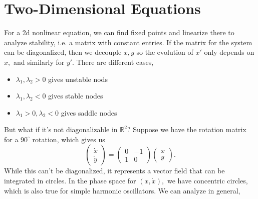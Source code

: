 \documentclass{article}
\numberwithin{equation}{section}
\begin{document}
\section{Two-Dimensional Equations}
For a 2d nonlinear equation, we can find fixed points and linearize there to analyze stability, i.e. a matrix with constant entries. If the matrix for the system can be diagonalized, then we decouple $x,y$ so the evolution of $x'$ only depends on $x,$ and similarly for $y'.$ There are different cases,
\begin{itemize}
    \item $\lambda_1,\lambda_2>0$ gives unstable nods
    \item $\lambda_1,\lambda_2<0$ gives stable nodes
    \item $\lambda_1>0,\lambda_2<0$ gives saddle nodes
\end{itemize}
But what if it's not diagonalizable in $\mathbb{R}^2?$ Suppose we have the rotation matrix for a $90^\circ$ rotation, which gives us 
\begin{equation*}
    \begin{pmatrix}
        \dot{x} \\ \dot{y}
    \end{pmatrix} = \begin{pmatrix}
        0 & -1 \\ 
        1 & 0
    \end{pmatrix}\begin{pmatrix}
        x\\y 
    \end{pmatrix}.
\end{equation*}
While this can't be diagonalized, it represents a vector field that can be integrated in circles. In the phase space for $(x,\dot{x}),$ we have concentric circles, which is also true for simple harmonic oscillators. We can analyze in general,
\end{document}
